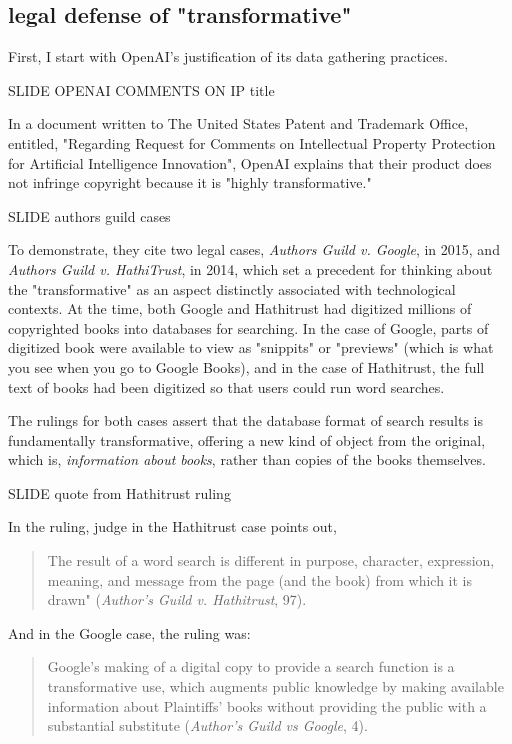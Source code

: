 \documentclass[11pt]{article}
\begin{document}
\subsection{legal defense of "transformative"}
\label{sec:org1cbc8a2}
First, I start with OpenAI's justification of its data gathering
practices.

SLIDE OPENAI COMMENTS ON IP title

In a document written to The United States Patent and Trademark
Office, entitled, "Regarding Request for Comments on Intellectual
Property Protection for Artificial Intelligence Innovation", OpenAI
explains that their product does not infringe copyright because it
is "highly transformative."

SLIDE authors guild cases

To demonstrate, they cite two legal cases, \emph{Authors Guild v. Google},
in 2015, and \emph{Authors Guild v. HathiTrust}, in 2014, which set a
precedent for thinking about the "transformative" as an aspect
distinctly associated with technological contexts. At the time, both
Google and Hathitrust had digitized millions of copyrighted books into
databases for searching. In the case of Google, parts of digitized
book were available to view as "snippits" or "previews" (which is what
you see when you go to Google Books), and in the case of Hathitrust,
the full text of books had been digitized so that users could run word
searches.

The rulings for both cases assert that the database format of search
results is fundamentally transformative, offering a new kind of object
from the original, which is, \emph{information about books}, rather than
copies of the books themselves.

SLIDE quote from Hathitrust ruling

In the ruling, judge in the Hathitrust case points out,

\begin{quote}
The result of a word search is different in purpose, character,
expression, meaning, and message from the page (and the book) from
which it is drawn" (\emph{Author's Guild v. Hathitrust}, 97).
\end{quote}

And in the Google case, the ruling was:

\begin{quote}
Google’s making of a digital copy to provide a search function is a
transformative use, which augments public knowledge by making
available information about Plaintiffs’ books without providing the
public with a substantial substitute (\emph{Author's Guild vs Google}, 4).
\end{quote}
\end{document}
